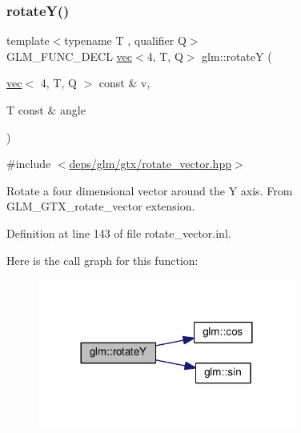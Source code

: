 \subsubsection{\texorpdfstring{rotate\+Y()}{rotateY()}\hspace{0.1cm}{\footnotesize\ttfamily [2/2]}}
{\footnotesize\ttfamily template$<$typename T , qualifier Q$>$ \\
G\+L\+M\+\_\+\+F\+U\+N\+C\+\_\+\+D\+E\+CL \hyperlink{structglm_1_1vec}{vec}$<$4, T, Q$>$ glm\+::rotateY (\begin{DoxyParamCaption}\item[{\hyperlink{structglm_1_1vec}{vec}$<$ 4, T, Q $>$ const \&}]{v,  }\item[{T const \&}]{angle }\end{DoxyParamCaption})}



{\ttfamily \#include $<$\hyperlink{rotate__vector_8hpp}{deps/glm/gtx/rotate\+\_\+vector.\+hpp}$>$}

Rotate a four dimensional vector around the Y axis. From G\+L\+M\+\_\+\+G\+T\+X\+\_\+rotate\+\_\+vector extension. 

Definition at line 143 of file rotate\+\_\+vector.\+inl.

Here is the call graph for this function\+:
\nopagebreak
\begin{figure}[H]
\begin{center}
\leavevmode
\includegraphics[width=240pt]{df/d02/group__gtx__rotate__vector_ga3ce3db0867b7f8efd878ee34f95a623b_cgraph}
\end{center}
\end{figure}
\mbox{\label{group__gtx__rotate__vector_ga5a048838a03f6249acbacb4dbacf79c4}} 
